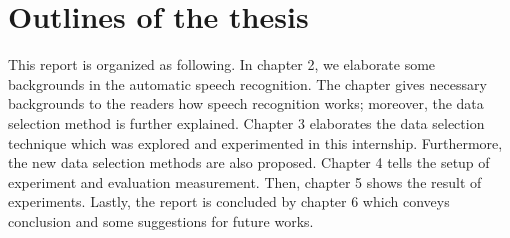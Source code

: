 \section{Outlines of the thesis}
This report is organized as following. In chapter 2, we elaborate some backgrounds in the automatic speech recognition. The chapter gives necessary backgrounds to the readers how speech recognition works; moreover, the  data selection method is further explained. Chapter 3 elaborates the data selection technique which was explored and experimented in this internship. Furthermore,  the new data selection methods are also proposed. Chapter 4 tells the setup of experiment and evaluation measurement. Then, chapter 5 shows the result of experiments. Lastly, the report is concluded by chapter 6 which conveys conclusion and some suggestions for future works. 
